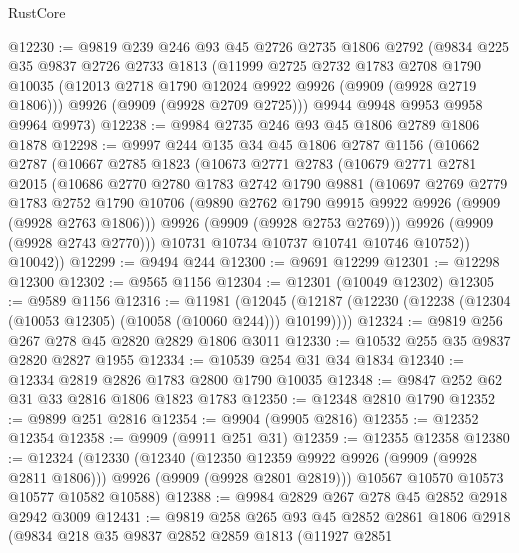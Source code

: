\begin{lexlean}{RustCore}
\begin{coremodule}
@12230 := @9819
    @239
    @246
    @93
    @45
    @2726
    @2735
    @1806
    @2792
    (@9834
      @225
      @35
      @9837
      @2726
      @2733
      @1813
      (@11999
        @2725
        @2732
        @1783
        @2708
        @1790
        @10035
        (@12013 @2718 @1790 @12024 @9922 @9926 (@9909 (@9928 @2719 @1806)))
        @9926
        (@9909 (@9928 @2709 @2725)))
      @9944
      @9948
      @9953
      @9958
      @9964
      @9973)
@12238 := @9984 @2735 @246 @93 @45 @1806 @2789 @1806 @1878
@12298 := @9997
    @244
    @135
    @34
    @45
    @1806
    @2787
    @1156
    (@10662
      @2787
      (@10667
        @2785
        @1823
        (@10673
          @2771
          @2783
          (@10679
            @2771
            @2781
            @2015
            (@10686
              @2770
              @2780
              @1783
              @2742
              @1790
              @9881
              (@10697
                @2769
                @2779
                @1783
                @2752
                @1790
                @10706
                (@9890 @2762 @1790 @9915 @9922 @9926 (@9909 (@9928 @2763 @1806)))
                @9926
                (@9909 (@9928 @2753 @2769)))
              @9926
              (@9909 (@9928 @2743 @2770)))
            @10731
            @10734
            @10737
            @10741
            @10746
            @10752))
        @10042))
@12299 := @9494 @244
@12300 := @9691 @12299
@12301 := @12298 @12300
@12302 := @9565 @1156
@12304 := @12301 (@10049 @12302)
@12305 := @9589 @1156
@12316 := @11981
    (@12045 (@12187 (@12230 (@12238 (@12304 (@10053 @12305) (@10058 (@10060 @244))) @10199))))
@12324 := @9819 @256 @267 @278 @45 @2820 @2829 @1806 @3011
@12330 := @10532 @255 @35 @9837 @2820 @2827 @1955
@12334 := @10539 @254 @31 @34 @1834
@12340 := @12334 @2819 @2826 @1783 @2800 @1790 @10035
@12348 := @9847 @252 @62 @31 @33 @2816 @1806 @1823 @1783
@12350 := @12348 @2810 @1790
@12352 := @9899 @251 @2816
@12354 := @9904 (@9905 @2816)
@12355 := @12352 @12354
@12358 := @9909 (@9911 @251 @31)
@12359 := @12355 @12358
@12380 := @12324
    (@12330
      (@12340
        (@12350 @12359 @9922 @9926 (@9909 (@9928 @2811 @1806)))
        @9926
        (@9909 (@9928 @2801 @2819)))
      @10567
      @10570
      @10573
      @10577
      @10582
      @10588)
@12388 := @9984 @2829 @267 @278 @45 @2852 @2918 @2942 @3009
@12431 := @9819
    @258
    @265
    @93
    @45
    @2852
    @2861
    @1806
    @2918
    (@9834
      @218
      @35
      @9837
      @2852
      @2859
      @1813
      (@11927
        @2851

\end{coremodule}
\end{lexlean}
